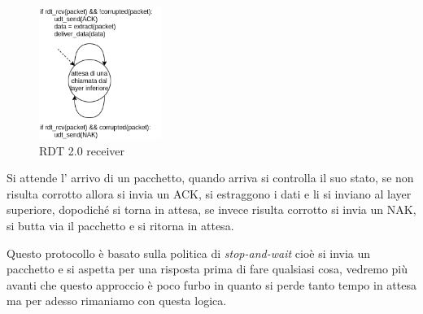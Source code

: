 \begin{figure}[H]
    \centering
    \includegraphics[width=150px]{images/3_Reti_connessione_diretta/rdt_2.0_receiver.png}
    \caption{RDT 2.0 receiver}
\end{figure}
Si attende l' arrivo di un pacchetto, quando arriva si controlla il suo stato, se non risulta corrotto allora si invia un ACK, si estraggono i dati e li si inviano al layer superiore, dopodiché si torna in attesa, se invece risulta corrotto si invia un NAK, si butta via il pacchetto e si ritorna in attesa.

Questo protocollo è basato sulla politica di \emph{stop-and-wait} cioè si invia un pacchetto e si aspetta per una risposta prima di fare qualsiasi cosa, vedremo più avanti che questo approccio è poco furbo in quanto si perde tanto tempo in attesa ma per adesso rimaniamo con questa logica.


